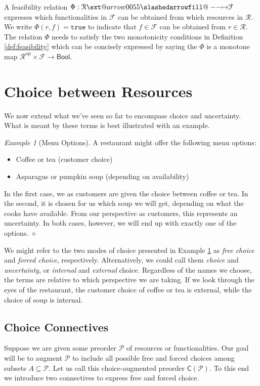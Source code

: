 \documentclass[12pt]{article}
\makeatletter
\theoremstyle{definition}
\theoremstyle{plain}
\theoremstyle{plain}
\theoremstyle{plain}
\theoremstyle{plain}
\theoremstyle{remark}
\newtheorem{example}[definition]{Example}
\newcommand\xqed[1]{%
	\leavevmode\unskip\penalty9999 \hbox{}\nobreak\hfill
	\quad\hbox{#1}}
\newcommand\exampleend{\xqed{$\diamond$}}
\theoremstyle{remark}
\newcommand{\mc}[1]{\mathcal{#1}}
\newcommand{\sub}{\subseteq}
\def\slashedarrowfill@#1#2#3#4#5{%
	$\m@th\thickmuskip0mu\medmuskip\thickmuskip\thinmuskip\thickmuskip
	\relax#5#1\mkern-7mu%
	\cleaders\hbox{$#5\mkern-2mu#2\mkern-2mu$}\hfill
	\mathclap{#3}\mathclap{#2}%
	\cleaders\hbox{$#5\mkern-2mu#2\mkern-2mu$}\hfill
	\mkern-7mu#4$%
}
\def\rightslashedarrowfill@{%
	\slashedarrowfill@\relbar\relbar\mapstochar\rightarrow}
\newcommand\xslashedrightarrow[2][]{%
	\ext@arrow 0055{\rightslashedarrowfill@}{#1}{#2}}
\makeatother
\begin{document}
\begin{tcolorbox}[title=Feasibility Relations, colframe=Apricot, colback = paleorange, coltitle = Sepia]
	A feasibility relation $\Phi: \mc{R} \xslashedrightarrow{} \mc{F}$ expresses which functionalities in $\mc{F}$ can be obtained from which resources in $\mc{R}$. We write $\Phi(r,f) = \mathtt{true}$ to indicate that $f \in \mc{F}$ can be obtained from $r \in \mc{R}$. The relation $\Phi$ needs to satisfy the two monotonicity conditions in Definition \ref{def:feasibility} which can be concisely expressed by saying the $\Phi$ is a monotone map $\mc{R}^\text{op} \times \mc{F} \rightarrow \mathsf{Bool}$.
\end{tcolorbox}

\section{Choice between Resources}
We now extend what we've seen so far to encompass choice and uncertainty. What is meant by these terms is best illustrated with an example.

\begin{example}[Menu Options]\label{ex:menu}
	A restaurant might offer the following menu options:
	\begin{itemize}
		\item Coffee or tea (customer choice)
		\item Asparagus or pumpkin soup (depending on availability)
	\end{itemize}
	In the first case, we as customers are given the choice between coffee or tea. In the second, it is chosen for us which soup we will get, depending on what the cooks have available. From our perspective as customers, this represents an uncertainty. In both cases, however, we will end up with exactly one of the options. \exampleend
\end{example}

We might refer to the two modes of choice presented in Example \ref{ex:menu} as \emph{free choice} and \emph{forced choice}, respectively. Alternatively, we could call them \emph{choice} and \emph{uncertainty}, or \emph{internal} and \emph{external} choice. Regardless of the names we choose, the terms are relative to which perspective we are taking. If we look through the eyes of the restaurant, the customer choice of coffee or tea is external, while the choice of soup is internal.

\subsection{Choice Connectives}
Suppose we are given some preorder $\mc{P}$ of resources or functionalities. Our goal will be to augment $\mc{P}$ to include all possible free and forced choices among subsets $A \sub \mc{P}$. Let us call this choice-augmented preorder $\mathsf{C}(\mc{P})$. To this end we introduce two connectives to express free and forced choice.
\end{document}
